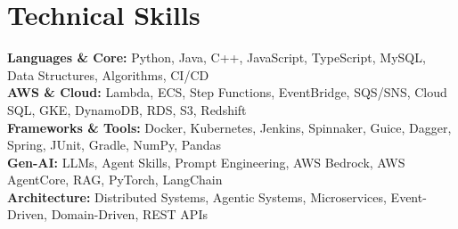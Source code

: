 
\section{Technical Skills}
    \begin{itemize}[leftmargin=0.15in, label={}]
	\small{\item{
    \textbf{Languages \& Core:} Python, Java, C++, JavaScript, TypeScript, MySQL, Data Structures, Algorithms, CI/CD \\[4pt]
    \textbf{AWS \& Cloud:} Lambda, ECS, Step Functions, EventBridge, SQS/SNS, Cloud SQL, GKE, DynamoDB, RDS, S3, Redshift  \\[4pt]
    \textbf{Frameworks \& Tools:} Docker, Kubernetes, Jenkins, Spinnaker, Guice, Dagger, Spring, JUnit, Gradle, NumPy, Pandas \\[4pt]
    \textbf{Gen-AI:} LLMs, Agent Skills, Prompt Engineering, AWS Bedrock, AWS AgentCore, RAG, PyTorch, LangChain  \\[4pt]
    \textbf{Architecture:} Distributed Systems, Agentic Systems, Microservices, Event-Driven, Domain-Driven, REST APIs\\[4pt]
    }}
    \end{itemize}
